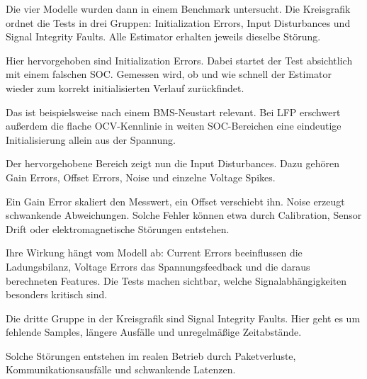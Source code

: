 \begin{sprechtext}

Die vier Modelle wurden dann in einem Benchmark untersucht. Die Kreisgrafik ordnet die Tests in drei Gruppen: Initialization Errors, Input Disturbances und Signal Integrity Faults. Alle Estimator erhalten jeweils dieselbe Störung.

Hier hervorgehoben sind Initialization Errors. Dabei startet der Test absichtlich mit einem falschen SOC. Gemessen wird, ob und wie schnell der Estimator wieder zum korrekt initialisierten Verlauf zurückfindet.

Das ist beispielsweise nach einem BMS-Neustart relevant. Bei LFP erschwert außerdem die flache OCV-Kennlinie in weiten SOC-Bereichen eine eindeutige Initialisierung allein aus der Spannung.

\end{sprechtext}


\begin{sprechtext}

Der hervorgehobene Bereich zeigt nun die Input Disturbances. Dazu gehören Gain Errors, Offset Errors, Noise und einzelne Voltage Spikes.

Ein Gain Error skaliert den Messwert, ein Offset verschiebt ihn. Noise erzeugt schwankende Abweichungen. Solche Fehler können etwa durch Calibration, Sensor Drift oder elektromagnetische Störungen entstehen.

Ihre Wirkung hängt vom Modell ab: Current Errors beeinflussen die Ladungsbilanz, Voltage Errors das Spannungsfeedback und die daraus berechneten Features. Die Tests machen sichtbar, welche Signalabhängigkeiten besonders kritisch sind.

\end{sprechtext}


\begin{sprechtext}

Die dritte Gruppe in der Kreisgrafik sind Signal Integrity Faults. Hier geht es um fehlende Samples, längere Ausfälle und unregelmäßige Zeitabstände.

Solche Störungen entstehen im realen Betrieb durch Paketverluste, Kommunikationsausfälle und schwankende Latenzen.

\end{sprechtext}

